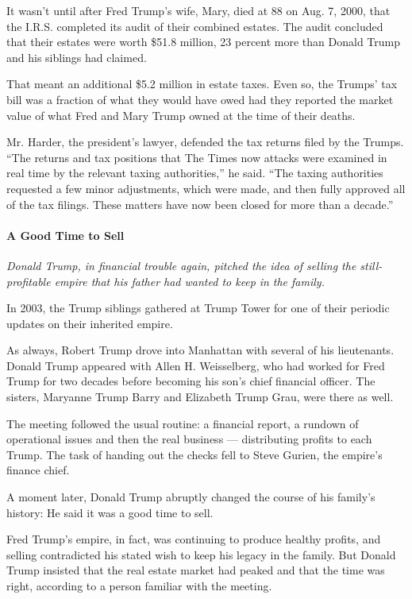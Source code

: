 It wasn't until after Fred Trump's wife, Mary, died at 88 on Aug. 7,
2000, that the I.R.S. completed its audit of their combined estates. The
audit concluded that their estates were worth \$51.8 million, 23 percent
more than Donald Trump and his siblings had claimed.

That meant an additional \$5.2 million in estate taxes. Even so, the
Trumps' tax bill was a fraction of what they would have owed had they
reported the market value of what Fred and Mary Trump owned at the time
of their deaths.

Mr. Harder, the president's lawyer, defended the tax returns filed by
the Trumps. ``The returns and tax positions that The Times now attacks
were examined in real time by the relevant taxing authorities,'' he
said. ``The taxing authorities requested a few minor adjustments, which
were made, and then fully approved all of the tax filings. These matters
have now been closed for more than a decade.''

\hypertarget{a-good-time-to-sell}{%
\paragraph{A Good Time to Sell}\label{a-good-time-to-sell}}

\emph{Donald Trump, in financial trouble again, pitched the idea of
selling the still-profitable empire that his father had wanted to keep}
\emph{in the family.}

In 2003, the Trump siblings gathered at Trump Tower for one of their
periodic updates on their inherited empire.

As always, Robert Trump drove into Manhattan with several of his
lieutenants. Donald Trump appeared with Allen H. Weisselberg, who had
worked for Fred Trump for two decades before becoming his son's chief
financial officer. The sisters, Maryanne Trump Barry and Elizabeth Trump
Grau, were there as well.

The meeting followed the usual routine: a financial report, a rundown of
operational issues and then the real business --- distributing profits
to each Trump. The task of handing out the checks fell to Steve Gurien,
the empire's finance chief.

A moment later, Donald Trump abruptly changed the course of his family's
history: He said it was a good time to sell.

Fred Trump's empire, in fact, was continuing to produce healthy profits,
and selling contradicted his stated wish to keep his legacy in the
family. But Donald Trump insisted that the real estate market had peaked
and that the time was right, according to a person familiar with the
meeting.

